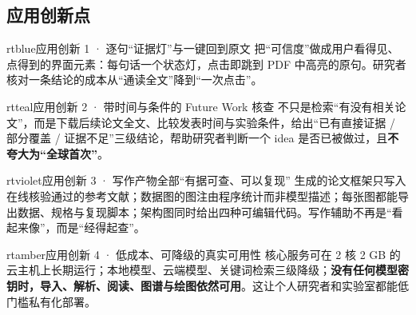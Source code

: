 \subsection{应用创新点}

\begin{innobox}{rtblue}{应用创新 1 · 逐句“证据灯”与一键回到原文}
把“可信度”做成用户看得见、点得到的界面元素：每句话一个状态灯，点击即跳到 PDF 中高亮的原句。研究者核对一条结论的成本从“通读全文”降到“一次点击”。
\end{innobox}

\begin{innobox}{rtteal}{应用创新 2 · 带时间与条件的 Future Work 核查}
不只是检索“有没有相关论文”，而是下载后续论文全文、比较发表时间与实验条件，给出“已有直接证据 / 部分覆盖 / 证据不足”三级结论，帮助研究者判断一个 idea 是否已被做过，且\textbf{不夸大为“全球首次”}。
\end{innobox}

\begin{innobox}{rtviolet}{应用创新 3 · 写作产物全部“有据可查、可以复现”}
生成的论文框架只写入在线核验通过的参考文献；数据图的图注由程序统计而非模型描述；每张图都能导出数据、规格与复现脚本；架构图同时给出四种可编辑代码。写作辅助不再是“看起来像”，而是“经得起查”。
\end{innobox}

\begin{innobox}{rtamber}{应用创新 4 · 低成本、可降级的真实可用性}
核心服务可在 2 核 2 GB 的云主机上长期运行；本地模型、云端模型、关键词检索三级降级；\textbf{没有任何模型密钥时，导入、解析、阅读、图谱与绘图依然可用}。这让个人研究者和实验室都能低门槛私有化部署。
\end{innobox}
